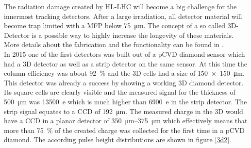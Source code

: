 The radiation damage created by \ac{HL-LHC} will become a big challenge for the innermost 
\noindent tracking detectors. After a large irradiation, all detector material will become trap limited with a \ac{MFP} below \SI{75}{\micro\meter}. The concept of a so called 3D-Detector is a possible way to highly increase the longevity of these materials. More details about the fabrication and the functionality can be found in \cite{3D}.\\
In 2015 one of the first detectors was built out of a \ac{pCVD} diamond sensor which had a 3D detector 
as well as a strip detector on the same sensor. At this time the column efficiency was about \SI{92}{\%} and the 3D cells had a size of \SI{150x150}{\micro\meter}. This detector was already a success by showing a working 3D diamond detector. Its square cells are clearly visible and the measured signal for the thickness of \SI{500}{\micro\meter} was \SI{13500}{e} which is much higher than \SI{6900}{e} in the strip detector. The strip signal equates to a \ac{CCD} of \SI{192}{\micro\meter}. The measured charge in the 3D would have a \ac{CCD} in a planar detector of \SIrange{350}{375}{\micro\meter} which effectively means that more than \SI{75}{\%} of the created charge was collected for the first time in a \ac{pCVD} diamond. The according pulse height distributions are shown in figure \vref{3d2}.\\
